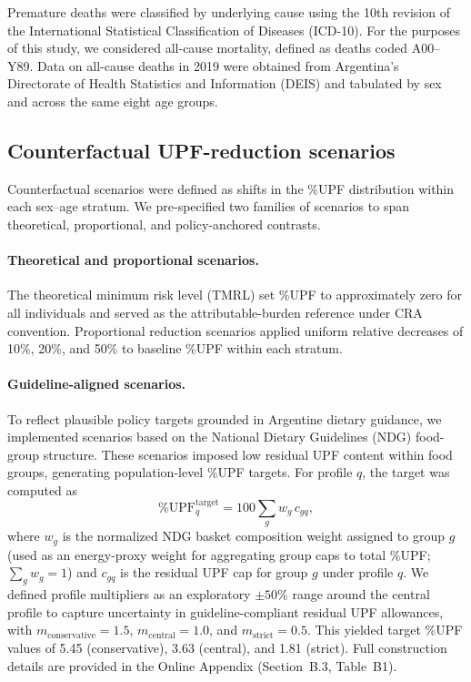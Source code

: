 \documentclass{article}
\begin{document}
Premature deaths were classified by underlying cause using the 10th revision of the International Statistical Classification of Diseases (ICD-10). For the purposes of this study, we considered all-cause mortality, defined as deaths coded A00–Y89. Data on all-cause deaths in 2019 were obtained from Argentina’s Directorate of Health Statistics and Information (DEIS)\cite{DEIS2019} and tabulated by sex and across the same eight age groups. 

\subsection{Counterfactual UPF-reduction scenarios}

Counterfactual scenarios were defined as shifts in the \%UPF distribution within each sex--age stratum. We pre-specified two families of scenarios to span theoretical, proportional, and policy-anchored contrasts.

\paragraph{Theoretical and proportional scenarios.}
The theoretical minimum risk level (TMRL) set \%UPF to approximately zero for all individuals and served as the attributable-burden reference under CRA convention. Proportional reduction scenarios applied uniform relative decreases of 10\%, 20\%, and 50\% to baseline \%UPF within each stratum.

\paragraph{Guideline-aligned scenarios.}
To reflect plausible policy targets grounded in Argentine dietary guidance, we implemented scenarios based on the National Dietary Guidelines (NDG) food-group structure.\cite{NDG2016} These scenarios imposed low residual UPF content within food groups, generating population-level \%UPF targets. For profile $q$, the target was computed as
%
\begin{equation}
\%\mathrm{UPF}^{\mathrm{target}}_q = 100\sum_g w_g\,c_{gq},
\end{equation}
%
where $w_g$ is the normalized NDG basket composition weight assigned to group $g$ (used as an energy-proxy weight for aggregating group caps to total \%UPF; $\sum_g w_g=1$) and $c_{gq}$ is the residual UPF cap for group $g$ under profile $q$. We defined profile multipliers as an exploratory $\pm50\%$ range around the central profile to capture uncertainty in guideline-compliant residual UPF allowances, with $m_{\text{conservative}}=1.5$, $m_{\text{central}}=1.0$, and $m_{\text{strict}}=0.5$. This yielded target \%UPF values of 5.45 (conservative), 3.63 (central), and 1.81 (strict). Full construction details are provided in the Online Appendix (Section~B.3, Table~B1).
\end{document}
